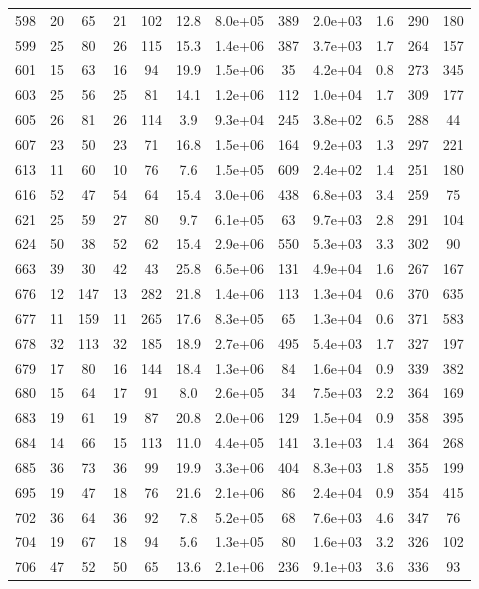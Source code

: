 \begin{table}
\begin{tabular}{cccccccccccc}
598 & 20 & 65 & 21 & 102 & 12.8 & 8.0e+05 & 389 & 2.0e+03 & 1.6 & 290 & 180 \\
599 & 25 & 80 & 26 & 115 & 15.3 & 1.4e+06 & 387 & 3.7e+03 & 1.7 & 264 & 157 \\
601 & 15 & 63 & 16 & 94 & 19.9 & 1.5e+06 & 35 & 4.2e+04 & 0.8 & 273 & 345 \\
603 & 25 & 56 & 25 & 81 & 14.1 & 1.2e+06 & 112 & 1.0e+04 & 1.7 & 309 & 177 \\
605 & 26 & 81 & 26 & 114 & 3.9 & 9.3e+04 & 245 & 3.8e+02 & 6.5 & 288 & 44 \\
607 & 23 & 50 & 23 & 71 & 16.8 & 1.5e+06 & 164 & 9.2e+03 & 1.3 & 297 & 221 \\
613 & 11 & 60 & 10 & 76 & 7.6 & 1.5e+05 & 609 & 2.4e+02 & 1.4 & 251 & 180 \\
616 & 52 & 47 & 54 & 64 & 15.4 & 3.0e+06 & 438 & 6.8e+03 & 3.4 & 259 & 75 \\
621 & 25 & 59 & 27 & 80 & 9.7 & 6.1e+05 & 63 & 9.7e+03 & 2.8 & 291 & 104 \\
624 & 50 & 38 & 52 & 62 & 15.4 & 2.9e+06 & 550 & 5.3e+03 & 3.3 & 302 & 90 \\
663 & 39 & 30 & 42 & 43 & 25.8 & 6.5e+06 & 131 & 4.9e+04 & 1.6 & 267 & 167 \\
676 & 12 & 147 & 13 & 282 & 21.8 & 1.4e+06 & 113 & 1.3e+04 & 0.6 & 370 & 635 \\
677 & 11 & 159 & 11 & 265 & 17.6 & 8.3e+05 & 65 & 1.3e+04 & 0.6 & 371 & 583 \\
678 & 32 & 113 & 32 & 185 & 18.9 & 2.7e+06 & 495 & 5.4e+03 & 1.7 & 327 & 197 \\
679 & 17 & 80 & 16 & 144 & 18.4 & 1.3e+06 & 84 & 1.6e+04 & 0.9 & 339 & 382 \\
680 & 15 & 64 & 17 & 91 & 8.0 & 2.6e+05 & 34 & 7.5e+03 & 2.2 & 364 & 169 \\
683 & 19 & 61 & 19 & 87 & 20.8 & 2.0e+06 & 129 & 1.5e+04 & 0.9 & 358 & 395 \\
684 & 14 & 66 & 15 & 113 & 11.0 & 4.4e+05 & 141 & 3.1e+03 & 1.4 & 364 & 268 \\
685 & 36 & 73 & 36 & 99 & 19.9 & 3.3e+06 & 404 & 8.3e+03 & 1.8 & 355 & 199 \\
695 & 19 & 47 & 18 & 76 & 21.6 & 2.1e+06 & 86 & 2.4e+04 & 0.9 & 354 & 415 \\
702 & 36 & 64 & 36 & 92 & 7.8 & 5.2e+05 & 68 & 7.6e+03 & 4.6 & 347 & 76 \\
704 & 19 & 67 & 18 & 94 & 5.6 & 1.3e+05 & 80 & 1.6e+03 & 3.2 & 326 & 102 \\
706 & 47 & 52 & 50 & 65 & 13.6 & 2.1e+06 & 236 & 9.1e+03 & 3.6 & 336 & 93 \\

\end{tabular}
\end{table}
